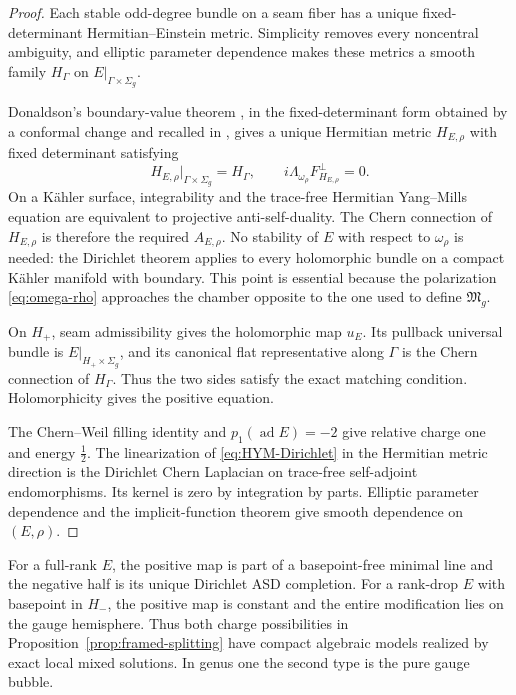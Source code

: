 \documentclass[11pt]{amsart}
\theoremstyle{definition}
\theoremstyle{remark}
\theoremstyle{plain}
\newcommand{\frakM}{\mathfrak{M}}
\newcommand{\ad}{\operatorname{ad}}
\begin{document}
\begin{proof}
Each stable odd-degree bundle on a seam fiber has a unique
fixed-determinant Hermitian--Einstein metric.  Simplicity removes every
noncentral ambiguity, and elliptic parameter dependence makes these
metrics a smooth family $H_\Gamma$ on
$E|_{\Gamma\times\Sigma_g}$.

Donaldson's boundary-value theorem
\cite{Donaldson92}, in the fixed-determinant form obtained
by a conformal change \cite[Proposition~2.14 and
Corollary~2.15]{Mochizuki20} and recalled in
\cite[Theorem~3.8 and Proposition~3.9]{Zhang24}, gives a unique Hermitian metric
$H_{E,\rho}$ with fixed determinant satisfying
\begin{equation}\label{eq:HYM-Dirichlet}
 H_{E,\rho}|_{\Gamma\times\Sigma_g}=H_\Gamma,
 \qquad
 i\Lambda_{\omega_\rho}F_{H_{E,\rho}}^\perp=0.
\end{equation}
On a K\"ahler surface, integrability and the trace-free Hermitian
Yang--Mills equation are equivalent to projective anti-self-duality.  The
Chern connection of $H_{E,\rho}$ is therefore the required
$A_{E,\rho}$.  No stability of $E$ with respect to $\omega_\rho$ is
needed: the Dirichlet theorem applies to every holomorphic bundle on a
compact K\"ahler manifold with boundary.  This point is essential because
the polarization \eqref{eq:omega-rho} approaches the chamber opposite to
the one used to define $\frakM_g$.

On $H_+$, seam admissibility gives the holomorphic map $u_E$.  Its
pullback universal bundle is $E|_{H_+\times\Sigma_g}$, and its canonical
flat representative along $\Gamma$ is the Chern connection of
$H_\Gamma$.  Thus the two sides satisfy the exact matching condition.
Holomorphicity gives the positive equation.

The Chern--Weil filling identity and $p_1(\ad E)=-2$ give relative charge
one and energy $\frac12$.  The linearization of
\eqref{eq:HYM-Dirichlet} in the Hermitian metric direction is the
Dirichlet Chern Laplacian on trace-free self-adjoint endomorphisms.  Its
kernel is zero by integration by parts.  Elliptic parameter dependence
and the implicit-function theorem give smooth dependence on $(E,\rho)$.
\end{proof}

For a full-rank $E$, the positive map is part of a basepoint-free minimal line and
the negative half is its unique Dirichlet ASD completion.  For a rank-drop
$E$ with basepoint in $H_-$, the positive map is constant and the entire
modification lies on the gauge hemisphere. Thus both charge
possibilities in Proposition~\ref{prop:framed-splitting}
have compact algebraic models realized by exact local mixed
solutions. In genus one the second type is the pure gauge bubble.
\end{document}
